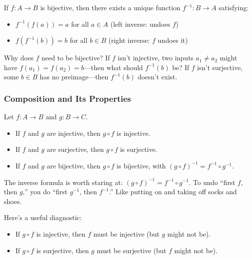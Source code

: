 \begin{definition}
If $f: A \to B$ is bijective, then there exists a unique function $f^{-1}: B \to A$ satisfying:
\begin{itemize}
  \item $f^{-1}(f(a)) = a$ for all $a \in A$ (left inverse: undoes $f$)
  \item $f(f^{-1}(b)) = b$ for all $b \in B$ (right inverse: $f$ undoes it)
\end{itemize}
\end{definition}

Why does $f$ need to be bijective? If $f$ isn't injective, two inputs $a_1 \neq a_2$ might have $f(a_1) = f(a_2) = b$---then what should $f^{-1}(b)$ be? If $f$ isn't surjective, some $b \in B$ has no preimage---then $f^{-1}(b)$ doesn't exist.

\subsubsection*{Composition and Its Properties}

\begin{proposition}
Let $f: A \to B$ and $g: B \to C$.
\begin{itemize}
  \item If $f$ and $g$ are injective, then $g \circ f$ is injective.
  \item If $f$ and $g$ are surjective, then $g \circ f$ is surjective.
  \item If $f$ and $g$ are bijective, then $g \circ f$ is bijective, with $(g \circ f)^{-1} = f^{-1} \circ g^{-1}$.
\end{itemize}
\end{proposition}

The inverse formula is worth staring at: $(g \circ f)^{-1} = f^{-1} \circ g^{-1}$. To undo ``first $f$, then $g$,'' you do ``first $g^{-1}$, then $f^{-1}$.'' Like putting on and taking off socks and shoes.

\begin{proposition}
Here's a useful diagnostic:
\begin{itemize}
  \item If $g \circ f$ is injective, then $f$ must be injective (but $g$ might not be).
  \item If $g \circ f$ is surjective, then $g$ must be surjective (but $f$ might not be).
\end{itemize}
\end{proposition}


